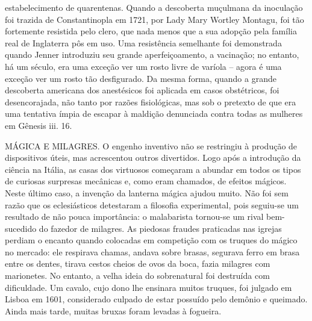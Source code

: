 \documentclass[11pt,a5paper,twoside,openany]{book}
\begin{document}
estabelecimento de quarentenas. Quando a descoberta muçulmana da inoculação foi trazida de Constantinopla em 1721, por Lady Mary Wortley Montagu, foi tão fortemente resistida pelo clero, que nada menos que a sua adopção pela família real de Inglaterra pôs em uso. Uma resistência semelhante foi demonstrada quando Jenner introduziu seu grande aperfeiçoamento, a vacinação; no entanto, há um século, era uma exceção ver um rosto livre de varíola – agora é uma exceção ver um rosto tão desfigurado. Da mesma forma, quando a grande descoberta americana dos anestésicos foi aplicada em casos obstétricos, foi desencorajada, não tanto por razões fisiológicas, mas sob o pretexto de que era uma tentativa ímpia de escapar à maldição denunciada contra todas as mulheres em Gênesis iii. 16.

MÁGICA E MILAGRES. O engenho inventivo não se restringiu à produção de dispositivos úteis, mas acrescentou outros divertidos. Logo após a introdução da ciência na Itália, as casas dos virtuosos começaram a abundar em todos os tipos de curiosas surpresas mecânicas e, como eram chamados, de efeitos mágicos. Neste último caso, a invenção da lanterna mágica ajudou muito. Não foi sem razão que os eclesiásticos detestaram a filosofia experimental, pois seguiu-se um resultado de não pouca importância: o malabarista tornou-se um rival bem-sucedido do fazedor de milagres. As piedosas fraudes praticadas nas igrejas perdiam o encanto quando colocadas em competição com os truques do mágico no mercado: ele respirava chamas, andava sobre brasas, segurava ferro em brasa entre os dentes, tirava cestos cheios de ovos da boca, fazia milagres com marionetes. No entanto, a velha ideia do sobrenatural foi destruída com dificuldade. Um cavalo, cujo dono lhe ensinara muitos truques, foi julgado em Lisboa em 1601, considerado culpado de estar possuído pelo demônio e queimado. Ainda mais tarde, muitas bruxas foram levadas à fogueira.
\end{document}
